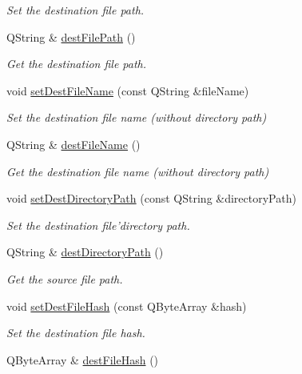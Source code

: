 \begin{DoxyCompactItemize}
\begin{DoxyCompactList}\small\item\em Set the destination file path. \end{DoxyCompactList}\item 
Q\-String \& \hyperlink{classmdt_file_copier_item_ab5993351e732b94e723621f5227fdd90}{dest\-File\-Path} ()
\begin{DoxyCompactList}\small\item\em Get the destination file path. \end{DoxyCompactList}\item 
void \hyperlink{classmdt_file_copier_item_a6a600719fa48e8b92ec93e024c482302}{set\-Dest\-File\-Name} (const Q\-String \&file\-Name)
\begin{DoxyCompactList}\small\item\em Set the destination file name (without directory path) \end{DoxyCompactList}\item 
Q\-String \& \hyperlink{classmdt_file_copier_item_af23cdc4c19fb8b80b7781c9dbe3bdc21}{dest\-File\-Name} ()
\begin{DoxyCompactList}\small\item\em Get the destination file name (without directory path) \end{DoxyCompactList}\item 
void \hyperlink{classmdt_file_copier_item_a64b6cb199454a76f1ceac9a658f62f83}{set\-Dest\-Directory\-Path} (const Q\-String \&directory\-Path)
\begin{DoxyCompactList}\small\item\em Set the destination file'directory path. \end{DoxyCompactList}\item 
Q\-String \& \hyperlink{classmdt_file_copier_item_a6a459a2ed4318b3862cb55d0b62a3ecf}{dest\-Directory\-Path} ()
\begin{DoxyCompactList}\small\item\em Get the source file path. \end{DoxyCompactList}\item 
void \hyperlink{classmdt_file_copier_item_abeb35b72a31306c1fa2bf49a9cc2baea}{set\-Dest\-File\-Hash} (const Q\-Byte\-Array \&hash)
\begin{DoxyCompactList}\small\item\em Set the destination file hash. \end{DoxyCompactList}\item 
Q\-Byte\-Array \& \hyperlink{classmdt_file_copier_item_a6e3a39ed3015e94ed3504cde79fe6a61}{dest\-File\-Hash} ()

\end{DoxyCompactItemize}
